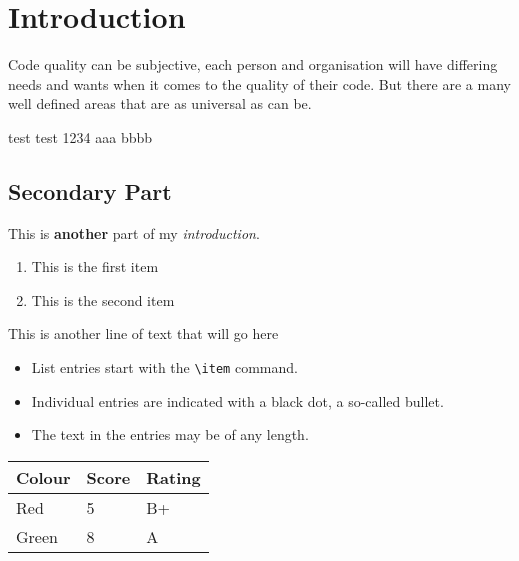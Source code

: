 \section{Introduction}
Code quality can be subjective, each person and organisation will have differing needs and wants when it comes to the quality of their code. But there are a many well defined areas that are as universal as can be.

test test
1234 aaa bbbb
\subsection{Secondary Part}
This is \textbf{another} part of my \textit{introduction}.

\begin{enumerate}
    \item This is the first item
    \item This is the second item
\end{enumerate}

This is another line of text that will go here

\begin{itemize}
  \item List entries start with the \verb|\item| command.
  \item Individual entries are indicated with a black dot, a so-called bullet.
  \item The text in the entries may be of any length.
\end{itemize}

\begin{table}[h]
\begin{tabular}{lll}
\hline
Colour & Score & Rating \\ \hline
Red    & 5     & B+     \\
Green  & 8     & A      \\ \hline
\end{tabular}
\end{table}